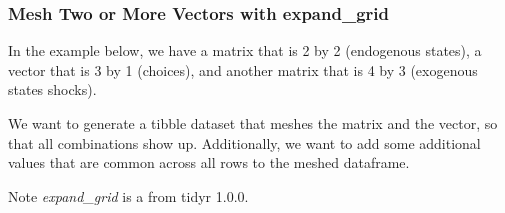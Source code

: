 \documentclass[
]{book}
\begin{document}
\hypertarget{mesh-two-or-more-vectors-with-expand_grid}{%
\subsubsection{Mesh Two or More Vectors with expand\_grid}\label{mesh-two-or-more-vectors-with-expand_grid}}

In the example below, we have a matrix that is 2 by 2 (endogenous states), a vector that is 3 by 1 (choices), and another matrix that is 4 by 3 (exogenous states shocks).

We want to generate a tibble dataset that meshes the matrix and the vector, so that all combinations show up. Additionally, we want to add some additional values that are common across all rows to the meshed dataframe.

Note \emph{expand\_grid} is a from tidyr 1.0.0.
\end{document}
